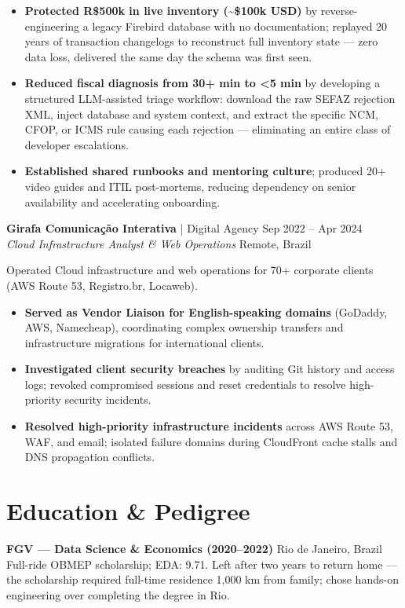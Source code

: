 \documentclass[11pt,letterpaper]{article}
\begin{document}
\begin{itemize}[topsep=4pt]
    \item \textbf{Protected R\$500k in live inventory (\textasciitilde{}\$100k USD)} by reverse-engineering a legacy Firebird database with no documentation; replayed 20 years of transaction changelogs to reconstruct full inventory state — zero data loss, delivered the same day the schema was first seen.
    \item \textbf{Reduced fiscal diagnosis from 30+ min to \textless{}5 min} by developing a structured LLM-assisted triage workflow: download the raw SEFAZ rejection XML, inject database and system context, and extract the specific NCM, CFOP, or ICMS rule causing each rejection --- eliminating an entire class of developer escalations.
    \item \textbf{Established shared runbooks and mentoring culture}; produced 20+ video guides and ITIL post-mortems, reducing dependency on senior availability and accelerating onboarding.
\end{itemize}

\vspace{4pt}
\textbf{Girafa Comunicação Interativa} | Digital Agency \hfill Sep 2022 -- Apr 2024 \\
\textit{Cloud Infrastructure Analyst \& Web Operations} \hfill Remote, Brazil

Operated Cloud infrastructure and web operations for 70+ corporate clients (AWS Route 53, Registro.br, Locaweb).
\begin{itemize}[topsep=4pt]
    \item \textbf{Served as Vendor Liaison for English-speaking domains} (GoDaddy, AWS, Namecheap), coordinating complex ownership transfers and infrastructure migrations for international clients.
    \item \textbf{Investigated client security breaches} by auditing Git history and access logs; revoked compromised sessions and reset credentials to resolve high-priority security incidents.
    \item \textbf{Resolved high-priority infrastructure incidents} across AWS Route 53, WAF, and email; isolated failure domains during CloudFront cache stalls and DNS propagation conflicts.
\end{itemize}

\section{Education \& Pedigree}
\textbf{FGV --- Data Science \& Economics (2020--2022)} \hfill Rio de Janeiro, Brazil \\
Full-ride OBMEP scholarship; EDA: 9.71. Left after two years to return home --- the scholarship required full-time residence 1,000 km from family; chose hands-on engineering over completing the degree in Rio.
\end{document}
